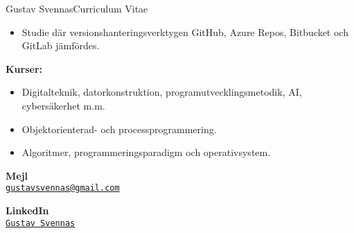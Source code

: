 \documentclass{article}
\begin{document}
\begin{cv}{Gustav Svennas}{Curriculum Vitae}

\begin{cvevent}[2023-04][2023-06]
    \begin{itemize}
        \item Studie där versionshanteringsverktygen GitHub, Azure Repos, Bitbucket och GitLab jämfördes.
    \end{itemize}
\end{cvevent}

\begin{cvevent}[2018-09][2023-06]
    \textbf{Kurser:}
    \begin{itemize}
        \item Digitalteknik, datorkonstruktion, programutvecklingsmetodik, AI, cybersäkerhet m.m.
        \item Objektorienterad- och processprogrammering. 
        \item Algoritmer, programmeringsparadigm och operativsystem.
    \end{itemize}
\end{cvevent}


\begin{cvevent}[2017-06][2020-06]
\end{cvevent}


\cvsidebar %



\begin{cvitem}[Envelope][4]
    \textbf{Mejl}\\
    \href{mailto:gustavsvennas@gmail.com}{\texttt{gustavsvennas@gmail.com}}
\end{cvitem}

\cvseparator[3]
\begin{cvitem}[Globe][4]
    \textbf{LinkedIn}\\
    \href{https://www.linkedin.com/in/gustav-svennas-18b575159}{\texttt{Gustav Svennas}}
\end{cvitem}


\end{cv}
\end{document}
